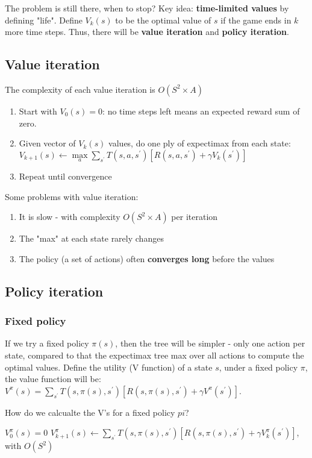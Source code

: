 \noindent 
The problem is still there, when to stop? Key idea: \textbf{time-limited values} by defining "life". Define $V_{k}(s)$ to be the optimal value of $s$ if the game ends in $k$ more time steps. Thus, there will be \textbf{value iteration} and \textbf{policy iteration}.

\subsection{Value iteration}
The complexity of each value iteration is $O(S^{2} \times A)$
\begin{enumerate}
    \item Start with $V_{0}(s) = 0$: no time steps left means an expected reward sum of zero.
    \item Given vector of $V_{k}(s)$ values, do one ply of expectimax from each state: $V_{k+1}(s) \leftarrow \max\limits_a \sum_{s^{\prime}} T(s,a,s^{\prime}) [R(s,a,s^{\prime}) + \gamma V_{k}(s^{\prime})]$
    \item Repeat until convergence
\end{enumerate}

\noindent
Some problems with value iteration:
\begin{enumerate}
    \item It is slow - with complexity $O(S^{2} \times A)$ per iteration
    \item The "max" at each state rarely changes
    \item The policy (a set of actions) often \textbf{converges long} before the values
\end{enumerate}

\subsection{Policy iteration}
\subsubsection{Fixed policy}
If we try a fixed policy $\pi(s)$, then the tree will be simpler - only one action per state, compared to that the expectimax tree max over all actions to compute the optimal values. Define the utility (V function) of a state $s$, under a fixed policy $\pi$, the value function will be: $V^{\pi}(s) = \sum_{s^{\prime}} T(s,\pi(s),s^{\prime}) [R(s,\pi(s),s^{\prime}) + \gamma V^{\pi}(s^{\prime})]$.

\noindent
How do we calcualte the V's for a fixed policy $pi$? 
\begin{outline}
    \1 $V_{0}^{\pi} (s) = 0$
    \1 $V_{k+1}^{\pi} (s) \leftarrow \sum_{s^{\prime}} T(s,\pi(s),s^{\prime}) [R(s,\pi(s),s^{\prime}) + \gamma V_{k}^{\pi} (s^{\prime})]$, with $O(S^{2})$
\end{outline}

